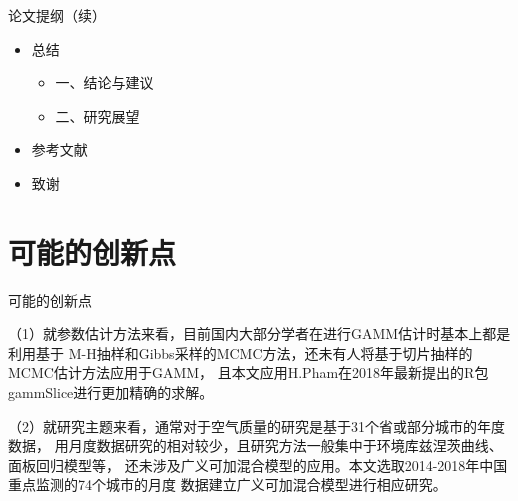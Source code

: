 \documentclass[ignorenonframetext,11pt,xcolor=dvipsnames,aspectratio=1610,hyperref={bookmarksdepth=4}]{beamer}
\providecommand{\tightlist}{%
  \setlength{\itemsep}{0pt}\setlength{\parskip}{0pt}}
\begin{document}
\begin{frame}{论文提纲（续）}

\begin{itemize}
\item
  总结

  \begin{itemize}
  \tightlist
  \item
    一、结论与建议
  \item
    二、研究展望
  \end{itemize}
\item
  参考文献
\item
  致谢
\end{itemize}

\end{frame}

\section{可能的创新点}

\begin{frame}{可能的创新点}

（1）就参数估计方法来看，目前国内大部分学者在进行GAMM估计时基本上都是利用基于
M-H抽样和Gibbs采样的MCMC方法，还未有人将基于切片抽样的MCMC估计方法应用于GAMM，
且本文应用H.Pham在2018年最新提出的R包gammSlice进行更加精确的求解。

（2）就研究主题来看，通常对于空气质量的研究是基于31个省或部分城市的年度数据，
用月度数据研究的相对较少，且研究方法一般集中于环境库兹涅茨曲线、面板回归模型等，
还未涉及广义可加混合模型的应用。本文选取2014-2018年中国重点监测的74个城市的月度
数据建立广义可加混合模型进行相应研究。

\end{frame}
\end{document}
